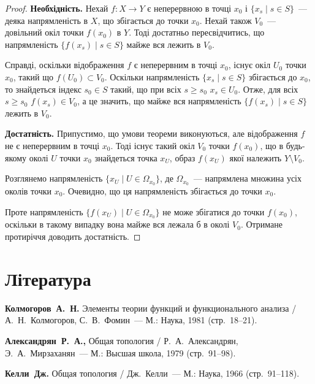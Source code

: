 \begin{proof}
    \textbf{Необхідність.} Нехай $f: X \to Y$ є неперервною в точці $x_0$ і $\{x_s \mid s \in S\}$~--- деяка напрямленість в $X$, що збігається до точки $x_0$. Нехай також $V_0$~--- довільний окіл точки $f(x_0)$ в $Y$. Тоді достатньо пересвідчитись, що напрямленість $\{f(x_s) \mid s \in S\}$ майже вся лежить в $V_0$. 
    
    Справді, оскільки відображення $f$ є неперервним в точці $x_0$, існує окіл $U_0$ точки $x_0$, такий що $f(U_0) \subset V_0$. Оскільки напрямленість $\{x_s \mid s \in S\}$ збігається до $x_0$, то знайдеться індекс $s_0 \in S$ такий, що при всіх $s \ge s_0$ $x_s \in U_0$. Отже, для всіх $s \ge s_0$ $f(x_s) \in V_0$, а це значить, що майже вся напрямленість $\{f(x_s) \mid s \in S\}$ лежить в $V_0$. 

    \textbf{Достатність.} Припустимо, що умови теореми виконуються, але відображення $f$ не є неперервним в точці $x_0$. Тоді існує такий окіл $V_0$ точки $f(x_0)$, що в будь-якому околі $U$ точки $x_0$ знайдеться точка $x_U$, образ $f(x_U)$ якої належить $Y \setminus V_0$. 
    
    Розглянемо напрямленість $\{x_U \mid U \in \Omega_{x_0}\}$, де $\Omega_{x_0}$~--- напрямлена множина усіх околів точки $x_0$. Очевидно, що ця напрямленість збігається до точки $x_0$. 
    
    Проте напрямленість $\{ f(x_U) \mid U \in \Omega_{x_0}\}$ не може збігатися до точки $f(x_0)$, оскільки в такому випадку вона майже вся лежала б в околі $V_0$. Отримане протиріччя доводить достатність.
\end{proof}

\section{Література}

\begin{enumerate}[label={[\arabic*]}]
\item \textbf{Колмогоров~А.~Н.}
Элементы теории функций и функционального анализа /
А.~Н.~Колмогоров, С.~В.~Фомин~---
М.: Наука, 1981 (стр.~18--21).
\item \textbf{Александрян~Р.~А., }
Общая топология /
Р.~А.~Александрян, Э.~А.~Мирзаханян~---
М.: Высшая школа, 1979 (стр.~91--98).
\item \textbf{Келли~Дж.}
Общая топология /
Дж.~Келли~---
М.: Наука, 1966 (стр.~91--118).
\end{enumerate}
